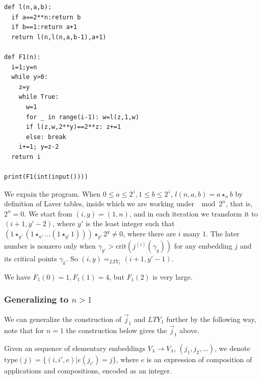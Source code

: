 \documentclass{article}
\theoremstyle{definition}
\theoremstyle{remark}
\begin{document}
\begin{lstlisting}
def l(n,a,b):
  if a==2**n:return b
  if b==1:return a+1
  return l(n,l(n,a,b-1),a+1)
 
def F1(n):
  i=1;y=n
  while y>0:
    z=y
    while True:
      w=1
      for _ in range(i-1): w=l(z,1,w)
      if l(z,w,2**y)==2**z: z+=1
      else: break
    i+=1; y=z-2
  return i
 
print(F1(int(input())))

\end{lstlisting}

We expain the program. When $0\le a\le 2^z, 1\le b\le 2^z$, $l(n,a,b)=a\star_n b$ by definition of Laver tables, inside which we are working under $\mod 2^n$, that is, $2^n=0$. We start from $(i,y)=(1,n)$, and in each iteration we transform it to $(i+1,y'-2)$, where $y'$ is the least integer such that $(1\star_{y'}(1\star_{u'}...(1\star_{y'}1)))\star_{y'}2^y\ne 0$, where there are $i$ many $1$. The later number is nonzero only when $\gamma_{y'}>\text{crit}(j^{(i)}(\gamma_y))$ for any embedding $j$ and its critical points $\gamma_k$. So $(i,y)=_{LTY_1}(i+1,y'-1)$.

We have $F_1(0)=1, F_1(1)=4$, but $F_1(2)$ is very large. 

\medskip

\subsubsection*{Generalizing to $n>1$}

We can generalize the construction of $\vec{j}_1$ and $LTY_1$ further by the following way, note that for $n=1$ the construction below gives the $\vec{j}_1$ above.

Given an sequence of elementary embeddings $V_\lambda\rightarrow V_\lambda$, $(j_1,j_2,...)$, we denote $\mathrm{type}(j)=\{(i,i',e)|e(j_{i'})=j\}$, where $e$ is an expression of composition of applications and compositions, encoded as an integer.
\end{document}
